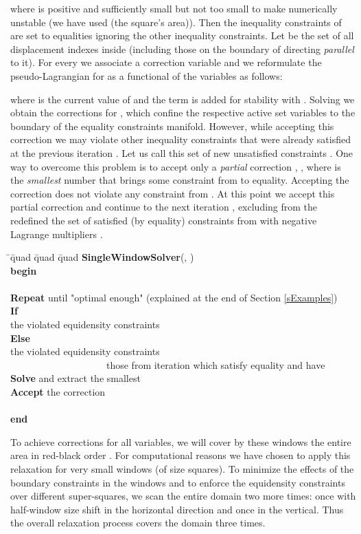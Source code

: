 \documentclass[final]{siamltex}
\newcommand{\keyw}[1]{{\bf #1}}
\begin{document}
where  is positive and sufficiently small but not too
small to make  numerically unstable (we have used
(the square's area)). Then the inequality
constraints of  are set to equalities ignoring the other
inequality constraints.
Let  be the set of all displacement indexes inside 
(including those on the boundary of  directing {\it
parallel} to it).
For every  we associate a correction variable
 and we reformulate the pseudo-Lagrangian for  as a
functional of the  variables as follows:

where  is the current value of  and the
 term is added for stability with . Solving
 we obtain the corrections
 for , which confine the
respective active set variables to the boundary of the equality
constraints manifold. However, while accepting this correction we
may violate other inequality constraints that were already
satisfied at the previous iteration . Let us call this set of
new unsatisfied constraints . One way to overcome
this problem is to accept only a {\it partial} correction , , where  is the {\it smallest}
number that brings some constraint from  to
equality. Accepting the correction  does not
violate any constraint from . At this point we
accept this partial correction and continue to the next iteration
, excluding from the redefined  the set of satisfied (by
equality) constraints from  with negative Lagrange
multipliers . \vspace{6mm}

\begin{tabbing}
  \quad \=\quad \=quad \=quad \=quad         \kill
  {\bf SingleWindowSolver}(, )\\
  \keyw{begin}\\
  \>  \\
  \> \keyw{Repeat} until "optimal enough" (explained at the end of Section \ref{sExamples})\\
  \>\> \keyw{If} \\
  \>\>\>the violated equidensity constraints\\
  \>\> \keyw{Else}\\
  \>\>\>the violated equidensity constraints\\
            ~~~~~~~~~~~~~~~~~~~~those from iteration  which satisfy equality and have \\
  \>\> \keyw{Solve}  and extract the smallest \\
  \>\> \keyw{Accept} the correction \\
  \>\> \\\keyw{end}\\
\end{tabbing}
\par To achieve corrections for all variables, we will cover by these windows the
entire area in red-black order \cite{mgbooktrott}. For
computational reasons we have chosen to apply this relaxation for
very small windows (of size  squares). To minimize the
effects of the boundary constraints in the windows and to enforce
the equidensity constraints over different super-squares, we scan the
entire domain two more times: once with
half-window size shift in the horizontal direction and once in the
vertical. Thus the overall relaxation process covers the domain
three times.
\end{document}
